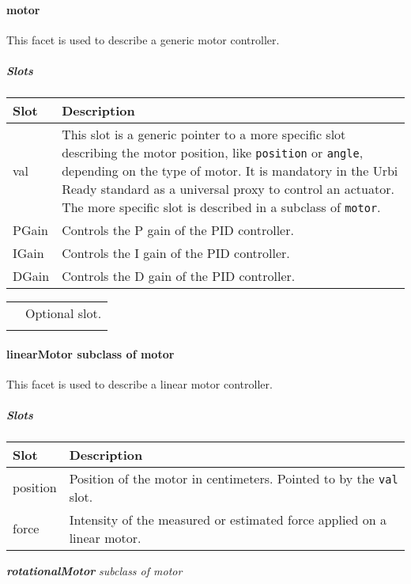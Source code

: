 \documentclass[a4paper]{article}
\begin{document}
\paragraph{motor}


This facet is used to describe a generic motor controller.

\subparagraph{Slots}

\begin{flushleft}
\tablehead{}
\begin{supertabular}{|m{2.8669999cm}|m{12.422cm}|}
\hline
\sffamily\bfseries Slot &
\sffamily\bfseries Description\\\hline
val &
\sffamily This slot is a generic pointer to a
more specific slot describing the motor position, like
\texttt{position} or \texttt{angle}, depending on the type of motor. It
is mandatory in the Urbi Ready standard as a universal proxy to control
an actuator. The more specific slot is described in a subclass of
\texttt{motor}.\\\hline
PGain &
\sffamily Controls the P gain of the PID
controller.\\\hline
IGain &
\sffamily Controls the I gain of the PID
controller.\\\hline
DGain &
\sffamily Controls the D gain of the PID
controller.\\\hline
\end{supertabular}
\end{flushleft}
\begin{flushleft}
\tablehead{}
\begin{supertabular}{|m{1.717cm}|m{10.464cm}}
\hhline{-~}
 &
\sffamily Optional slot.\\\hhline{-~}
\end{supertabular}
\end{flushleft}
\paragraph{ linearMotor  \textmd{subclass of motor}}


This facet is used to describe a linear motor controller.

\subparagraph{Slots}

\begin{flushleft}
\tablehead{}
\begin{supertabular}{|m{2.8669999cm}|m{12.422cm}|}
\hline
\sffamily\bfseries Slot &
\sffamily\bfseries Description\\\hline
position &
\sffamily Position of the motor in centimeters.
Pointed to by the \texttt{val} slot.\\\hline
force &
\sffamily Intensity of the measured or estimated
force applied on a linear motor.\\\hline
\end{supertabular}
\end{flushleft}
{
     \textbf{\textit{rotationalMotor}}
\textit{subclass of motor}}
\end{document}
